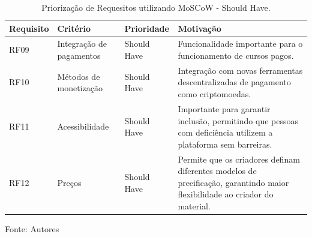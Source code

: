 \begin{apendicesenv}
\begin{table}[h]
    \centering
    \caption{Priorização de Requesitos utilizando MoSCoW - Should Have.}
    \label{tab:priorizacao_moscow2}
    \begin{adjustbox}{width=\textwidth}
        \begin{tabular}{|p{2.5cm}|p{5cm}|p{5cm}|p{4cm}|}
            \hline
            \textbf{Requisito} & \textbf{Critério} & \textbf{Prioridade} & \textbf{Motivação} \\
            \hline
            RF09 & Integração de pagamentos & Should Have & Funcionalidade importante para o funcionamento de cursos pagos. \\
            \hline
            RF10 & Métodos de monetização & Should Have & Integração com novas ferramentas descentralizadas de pagamento como criptomoedas. \\
            \hline
            RF11 & Acessibilidade & Should Have & Importante para garantir inclusão, permitindo que pessoas com deficiência utilizem a plataforma sem barreiras. \\
            \hline
            RF12 & Preços & Should Have & Permite que os criadores definam diferentes modelos de precificação, garantindo maior flexibilidade ao criador do material. \\
            \hline
        \end{tabular}
    \end{adjustbox}
    \vspace{5mm}
    {\footnotesize Fonte: Autores} 
\end{table}



\end{apendicesenv}

